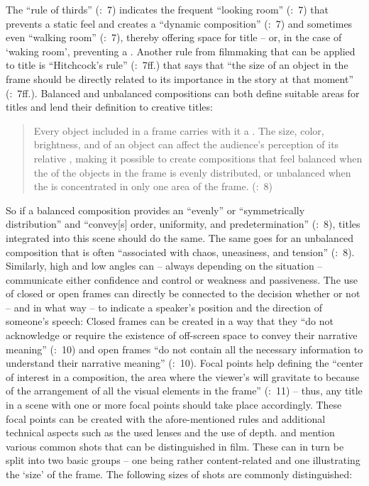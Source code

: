 The “rule of thirds” (\citealt{mercado2010}:~7) indicates the frequent “looking room” (\citeyear{mercado2010}:~7) that prevents a static feel and creates a “dynamic composition” (\citeyear{mercado2010}:~7) and sometimes even “walking room” (\citeyear{mercado2010}:~7), thereby offering space for title  – or, in the case of ‘waking room’, preventing a . Another rule from filmmaking that can be applied to title  is “Hitchcock’s rule” (\citealt{mercado2010}:~7ff.) that says that “the size of an object in the frame should be directly related to its importance in the story at that moment” (\citeyear{mercado2010}:~7ff.). Balanced and unbalanced compositions can both define suitable areas for titles and lend their definition to creative titles:
\begin{quote}
Every object included in a frame carries with it a . The size, color, brightness, and  of an object can affect the audience’s perception of its relative , making it possible to create compositions that feel balanced when the  of the objects in the frame is evenly distributed, or unbalanced when the  is concentrated in only one area of the frame. (\citealt{mercado2010}:~8)
\end{quote}
So if a balanced composition provides an “evenly” or “symmetrically distribution” and “convey[s] order, uniformity, and predetermination” (\citeyear{mercado2010}:~8), titles integrated into this scene should do the same. The same goes for an unbalanced composition that is often “associated with chaos, uneasiness, and tension” (\citeyear{mercado2010}:~8). Similarly, high and low angles can – always depending on the situation – communicate either confidence and control or weakness and passiveness. The use of closed or open frames can directly be connected to the decision whether or not – and in what way – to indicate a speaker’s position and the direction of someone’s speech: Closed frames can be created in a way that they “do not acknowledge or require the existence of off-screen space to convey their narrative meaning” (\citealt{mercado2010}:~10) and open frames “do not contain all the necessary information to understand their narrative meaning” (\citeyear{mercado2010}:~10). Focal points help defining the “center of interest in a composition, the area where the viewer’s  will gravitate to because of the arrangement of all the visual elements in the frame” (\citealt{mercado2010}:~11) – thus, any title  in a scene with one or more focal points should take place accordingly. These focal points can be created with the afore-mentioned rules and additional technical aspects such as the used lenses and the use of depth. \citet{mercado2010} and \citet{Kenworthy2011} mention various common shots that can be distinguished in film. These can in turn be split into two basic groups – one being rather content-related and one illustrating the ‘size’ of the frame. The following sizes of shots are commonly distinguished:

